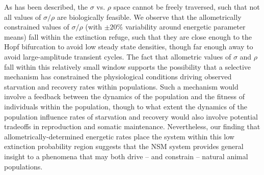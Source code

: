 \documentclass{pnastwo}
\begin{document}
\begin{article}
As has been described, the $\sigma$ vs. $\rho$ space cannot be freely traversed, such that not all values of $\sigma/\rho$ are biologically feasible.
We observe that the allometrically constrained values of $\sigma/\rho$ (with $\pm 20\%$ variability around energetic parameter means) fall within the extinction refuge, such that they are close enough to the Hopf bifurcation to avoid low steady state densities, though far enough away to avoid large-amplitude transient cycles.
The fact that allometric values of $\sigma$ and $\rho$ fall within this relatively small window supports the possibility that a selective mechanism has constrained the physiological conditions driving observed starvation and recovery rates within populations.
Such a mechanism would involve a feedback between the dynamics of the population and the fitness of individuals within the population, though to what extent the dynamics of the population influence rates of starvation and recovery would also involve potential tradeoffs in reproduction and somatic maintenance.
Nevertheless, our finding that allometrically-determined energetic rates place the system within this low extinction probability region suggests that the NSM system provides general insight to a phenomena that may both drive -- and constrain -- natural animal populations.










\end{article}
\end{document}
